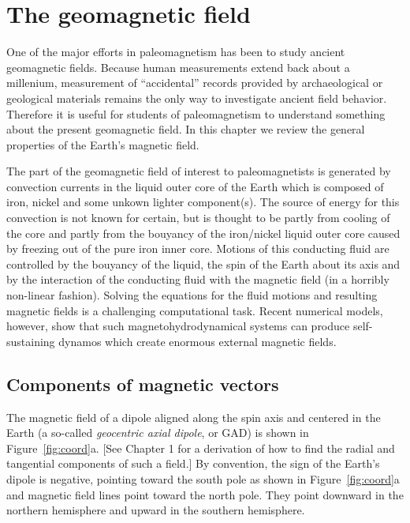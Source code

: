 \chapter{The geomagnetic field}



One of the major efforts in paleomagnetism has been to study
ancient geomagnetic fields. Because human measurements extend back about a millenium, measurement of ``accidental'' records provided by  archaeological or geological materials remains the only way to investigate ancient field behavior.  Therefore it is useful for students of paleomagnetism to understand something about the present geomagnetic field.  In this chapter we review the
general properties of the Earth's magnetic field.  

The part of the geomagnetic 
field of interest to paleomagnetists is generated by convection currents in the liquid outer core
of the Earth which is composed of iron, nickel and some unkown lighter
component(s). The source of energy for this convection is not known for certain, but is thought to be partly from cooling of the core and partly from the bouyancy of the iron/nickel liquid outer core caused by freezing out of the pure iron inner core.    Motions of this conducting fluid  are 
controlled by the bouyancy of the liquid, the 
spin of the Earth about its axis and by the interaction of the conducting fluid with the magnetic field (in a horribly non-linear fashion).  Solving the equations for the  fluid motions and resulting magnetic fields is a challenging computational task.   Recent numerical models, however, show that  such magnetohydrodynamical systems can   produce self-sustaining dynamos which  create
enormous external magnetic fields.  



\section {Components of magnetic vectors}
\label{sect:comp}

The magnetic field of a dipole aligned along the spin axis and centered in the Earth (a so-called 
%
{\it geocentric axial dipole}, or GAD) is shown in Figure~\ref{fig:coord}a. [See Chapter 1  for a derivation of  how to find the radial and tangential components of such a field.]   By convention, the sign of the Earth's dipole is negative, pointing toward the south pole as shown in Figure~\ref{fig:coord}a and magnetic field lines point toward the north pole.  They point  downward in the northern hemisphere and upward in the southern hemisphere.  

